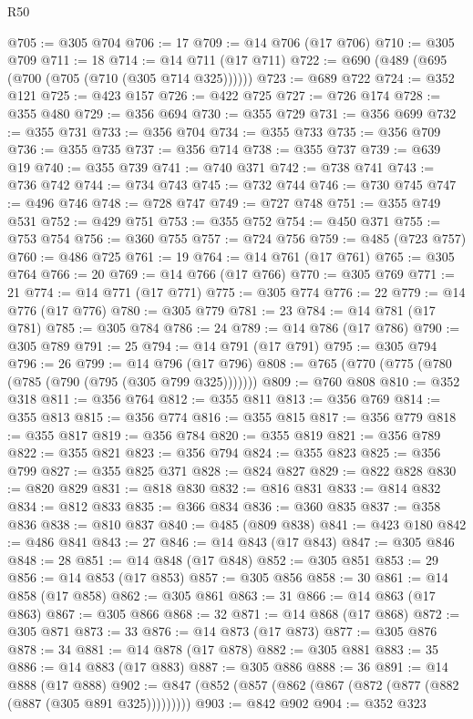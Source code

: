 \begin{lexlean}{R50}
\begin{coremodule}
@705 := @305 @704
@706 := 17
@709 := @14 @706 (@17 @706)
@710 := @305 @709
@711 := 18
@714 := @14 @711 (@17 @711)
@722 := @690 (@489 (@695 (@700 (@705 (@710 (@305 @714 @325))))))
@723 := @689 @722
@724 := @352 @121
@725 := @423 @157
@726 := @422 @725
@727 := @726 @174
@728 := @355 @480
@729 := @356 @694
@730 := @355 @729
@731 := @356 @699
@732 := @355 @731
@733 := @356 @704
@734 := @355 @733
@735 := @356 @709
@736 := @355 @735
@737 := @356 @714
@738 := @355 @737
@739 := @639 @19
@740 := @355 @739
@741 := @740 @371
@742 := @738 @741
@743 := @736 @742
@744 := @734 @743
@745 := @732 @744
@746 := @730 @745
@747 := @496 @746
@748 := @728 @747
@749 := @727 @748
@751 := @355 @749 @531
@752 := @429 @751
@753 := @355 @752
@754 := @450 @371
@755 := @753 @754
@756 := @360 @755
@757 := @724 @756
@759 := @485 (@723 @757)
@760 := @486 @725
@761 := 19
@764 := @14 @761 (@17 @761)
@765 := @305 @764
@766 := 20
@769 := @14 @766 (@17 @766)
@770 := @305 @769
@771 := 21
@774 := @14 @771 (@17 @771)
@775 := @305 @774
@776 := 22
@779 := @14 @776 (@17 @776)
@780 := @305 @779
@781 := 23
@784 := @14 @781 (@17 @781)
@785 := @305 @784
@786 := 24
@789 := @14 @786 (@17 @786)
@790 := @305 @789
@791 := 25
@794 := @14 @791 (@17 @791)
@795 := @305 @794
@796 := 26
@799 := @14 @796 (@17 @796)
@808 := @765 (@770 (@775 (@780 (@785 (@790 (@795 (@305 @799 @325)))))))
@809 := @760 @808
@810 := @352 @318
@811 := @356 @764
@812 := @355 @811
@813 := @356 @769
@814 := @355 @813
@815 := @356 @774
@816 := @355 @815
@817 := @356 @779
@818 := @355 @817
@819 := @356 @784
@820 := @355 @819
@821 := @356 @789
@822 := @355 @821
@823 := @356 @794
@824 := @355 @823
@825 := @356 @799
@827 := @355 @825 @371
@828 := @824 @827
@829 := @822 @828
@830 := @820 @829
@831 := @818 @830
@832 := @816 @831
@833 := @814 @832
@834 := @812 @833
@835 := @366 @834
@836 := @360 @835
@837 := @358 @836
@838 := @810 @837
@840 := @485 (@809 @838)
@841 := @423 @180
@842 := @486 @841
@843 := 27
@846 := @14 @843 (@17 @843)
@847 := @305 @846
@848 := 28
@851 := @14 @848 (@17 @848)
@852 := @305 @851
@853 := 29
@856 := @14 @853 (@17 @853)
@857 := @305 @856
@858 := 30
@861 := @14 @858 (@17 @858)
@862 := @305 @861
@863 := 31
@866 := @14 @863 (@17 @863)
@867 := @305 @866
@868 := 32
@871 := @14 @868 (@17 @868)
@872 := @305 @871
@873 := 33
@876 := @14 @873 (@17 @873)
@877 := @305 @876
@878 := 34
@881 := @14 @878 (@17 @878)
@882 := @305 @881
@883 := 35
@886 := @14 @883 (@17 @883)
@887 := @305 @886
@888 := 36
@891 := @14 @888 (@17 @888)
@902 := @847 (@852 (@857 (@862 (@867 (@872 (@877 (@882 (@887 (@305 @891 @325)))))))))
@903 := @842 @902
@904 := @352 @323

\end{coremodule}
\end{lexlean}
